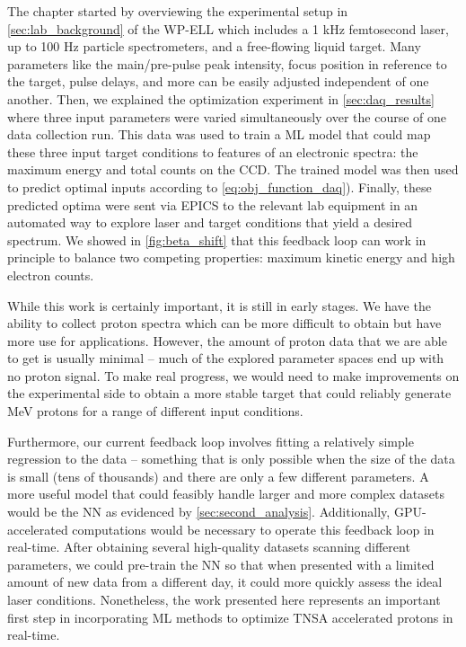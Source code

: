 The chapter started by overviewing the experimental setup in \autoref{sec:lab_background} of the \gls{WP-ELL} which includes a 1 kHz femtosecond laser, up to 100 Hz particle spectrometers, and a free-flowing liquid target. Many parameters like the main/pre-pulse peak intensity, focus position in reference to the target, pulse delays, and more can be easily adjusted independent of one another. Then, we explained the optimization experiment in \autoref{sec:daq_results} where three input parameters were varied simultaneously over the course of one data collection run. This data was used to train a \gls{ML} model that could map these three input target conditions to features of an electronic spectra: the maximum energy and total counts on the \gls{CCD}. The trained model was then used to predict optimal inputs according to \autoref{eq:obj_function_daq}). Finally, these predicted optima were sent via \gls{EPICS} to the relevant lab equipment in an automated way to explore laser and target conditions that yield a desired spectrum. We showed in \autoref{fig:beta_shift} that this feedback loop can work in principle to balance two competing properties: maximum kinetic energy and high electron counts. 

While this work is certainly important, it is still in early stages. We have the ability to collect proton spectra which can be more difficult to obtain but have more use for applications. However, the amount of proton data that we are able to get is usually minimal -- much of the explored parameter spaces end up with no proton signal. To make real progress, we would need to make improvements on the experimental side to obtain a more stable target that could reliably generate MeV protons for a range of different input conditions.

Furthermore, our current feedback loop involves fitting a relatively simple regression to the data -- something that is only possible when the size of the data is small (tens of thousands) and there are only a few different parameters. A more useful model that could feasibly handle larger and more complex datasets would be the \gls{NN} as evidenced by \autoref{sec:second_analysis}. Additionally, \gls{GPU}-accelerated computations would be necessary to operate this feedback loop in real-time. After obtaining several high-quality datasets scanning different parameters, we could pre-train the \gls{NN} so that when presented with a limited amount of new data from a different day, it could more quickly assess the ideal laser conditions. Nonetheless, the work presented here represents an important first step in incorporating \gls{ML} methods to optimize \gls{TNSA} accelerated protons in real-time. 
